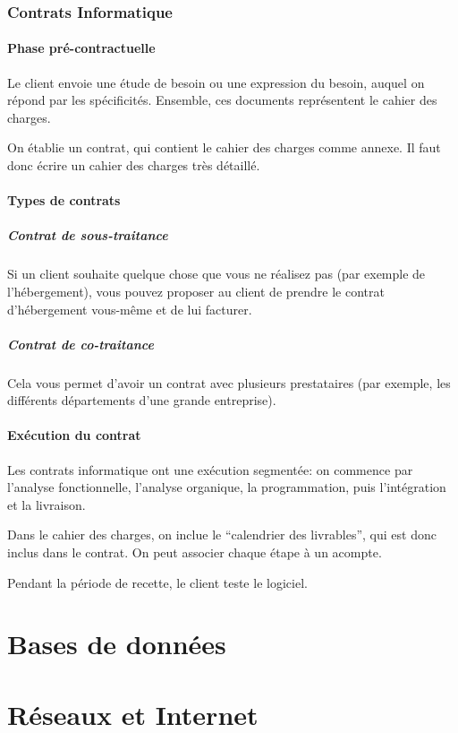 \documentclass[10pt,a4paper,french]{article}
\begin{document}
\section{Contrats Informatique}

\subsection{Phase pré-contractuelle}
Le client envoie une étude de besoin ou une expression du besoin, auquel on répond par les spécificités. Ensemble, ces documents représentent le cahier des charges.

On établie un contrat, qui contient le cahier des charges comme annexe. Il faut donc écrire un cahier des charges très détaillé.

\subsection{Types de contrats}

\subsubsection{Contrat de sous-traitance}
Si un client souhaite quelque chose que vous ne réalisez pas (par exemple de l'hébergement), vous pouvez proposer au client de prendre le contrat d'hébergement vous-même et de lui facturer.

\subsubsection{Contrat de co-traitance}
Cela vous permet d'avoir un contrat avec plusieurs prestataires (par exemple, les différents départements d'une grande entreprise).

\subsection{Exécution du contrat}
Les contrats informatique ont une exécution segmentée: on commence par l'analyse fonctionnelle, l'analyse organique, la programmation, puis l'intégration et la livraison.

Dans le cahier des charges, on inclue le ``calendrier des livrables'', qui est donc inclus dans le contrat. On peut associer chaque étape à un acompte.

Pendant la période de recette, le client teste le logiciel.

\part{Bases de données}

\part{Réseaux et Internet}

\appendix %

\printindex
\end{document}
